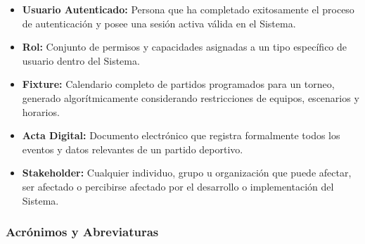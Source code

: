 \documentclass[12pt,a4paper]{article}
\begin{document}
\begin{itemize}[noitemsep]
    \item \textbf{Usuario Autenticado:} Persona que ha completado exitosamente el proceso de autenticación y posee una sesión activa válida en el Sistema.
    \item \textbf{Rol:} Conjunto de permisos y capacidades asignadas a un tipo específico de usuario dentro del Sistema.
    \item \textbf{Fixture:} Calendario completo de partidos programados para un torneo, generado algorítmicamente considerando restricciones de equipos, escenarios y horarios.
    \item \textbf{Acta Digital:} Documento electrónico que registra formalmente todos los eventos y datos relevantes de un partido deportivo.
    \item \textbf{Stakeholder:} Cualquier individuo, grupo u organización que puede afectar, ser afectado o percibirse afectado por el desarrollo o implementación del Sistema.
\end{itemize}

\subsubsection{Acrónimos y Abreviaturas}
\end{document}

